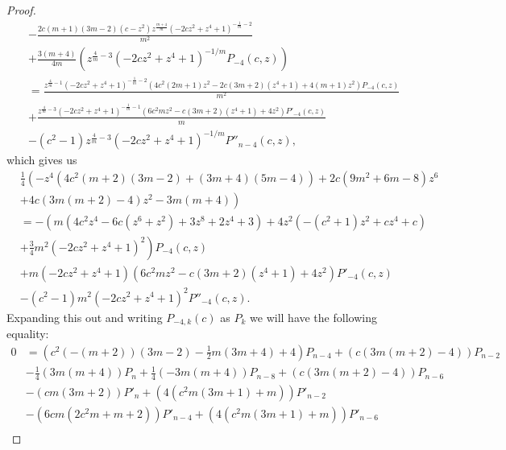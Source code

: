 \documentclass[review,nopreprintline]{elsarticle}
\theoremstyle{definition}
\numberwithin{equation}{section}
\theoremstyle{remark}
\begin{document}
\begin{proof}
\begin{align*}
	            &-\frac{2 c (m+1) (3 m-2) \left(c-z^2\right) z^{\frac{m+4}{m}} \left(-2 c z^2+z^4+1\right)^{-\frac{1}{m}-2}}{m^2}\\
	            &+\frac{3 (m+4)}{4 m}\left(z^{\frac{4}{m}-3}\left(-2 c z^2+z^4+1\right)^{-1/m}P_{-4}(c,z)\right)\\
	            &=\frac{z^{\frac{4}{m}-1} \left(-2 c z^2+z^4+1\right)^{-\frac{1}{m}-2} \left(4 c^2 (2 m+1) z^2-2 c (3 m+2) \left(z^4+1\right)+4 (m+1) z^2\right) P_{-4}(c,z)}{m^2}\\
	            &+\frac{z^{\frac{4}{m}-3} \left(-2 c z^2+z^4+1\right)^{-\frac{1}{m}-1} \left(6 c^2 m z^2-c (3 m+2) \left(z^4+1\right)+4 z^2\right) P'_{-4}(c,z)}{m}\\
	            &-\left(c^2-1\right) z^{\frac{4}{m}-3} \left(-2 c z^2+z^4+1\right)^{-1/m} P''_{n-4}(c,z),
	        \end{align*}
	        which gives us
	        \begin{align*}
	            &\frac{1}{4} \left(-z^4 \left(4 c^2 (m+2) (3 m-2)+(3 m+4) (5 m-4)\right)+2 c \left(9 m^2+6 m-8\right) z^6\right. \\
	            &\left.+4 c (3 m (m+2)-4) z^2-3 m (m+4)\right)\\
	            &=-\left(m \left(4 c^2 z^4-6 c \left(z^6+z^2\right)+3 z^8+2 z^4+3\right)+4 z^2 \left(-\left(c^2+1\right) z^2+c z^4+c\right)\right.\\
	            &\left.+\frac{3}{4} m^2 \left(-2 c z^2+z^4+1\right)^2\right) P_{-4}(c,z)\\
	            &+m \left(-2 c z^2+z^4+1\right) \left(6 c^2 m z^2-c (3 m+2) \left(z^4+1\right)+4 z^2\right) P'_{-4}(c,z)\\
	            &-\left(c^2-1\right) m^2 \left(-2 c z^2+z^4+1\right)^2 P''_{-4}(c,z).
	        \end{align*}
	        Expanding this out  and writing $P_{-4,k}(c)$ as $P_k$ we will have the following equality:
	        \begin{align}
	            0&=\left(c^2 (-(m+2)) (3 m-2)-\frac{1}{2} m (3 m+4)+4\right) P_{n-4} +(c (3 m (m+2)-4)) P_{n-2} \nonumber\\
	            &-\frac{1}{4} (3 m (m+4)) P_n +\frac{1}{4} (-3 m (m+4)) P_{n-8} +(c (3 m (m+2)-4)) P_{n-6} \nonumber\\
	            &-(c m (3 m+2)) P'_n +\left(4 \left(c^2 m (3 m+1)+m\right)\right) P'_{n-2} \nonumber\\
	            &-\left(6 c m \left(2 c^2 m+m+2\right)\right) P'_{n-4} +\left(4 \left(c^2 m (3 m+1)+m\right)\right) P'_{n-6} \nonumber\\

\end{align}
\end{proof}
\end{document}
